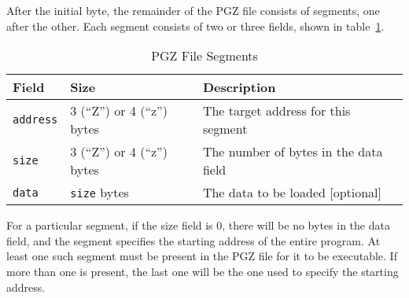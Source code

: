 After the initial byte, the remainder of the PGZ file consists of segments, one after the other. Each segment consists of two or three fields,
shown in table~\ref{tbl:pgz_file_segments}.

\begin{table}
	\begin{center}
		\begin{tabular}{|l|l|l|} \hline
			Field &	Size & Description \\ \hline\hline
			\verb+address+ & 3 (“Z”) or 4 (“z”) bytes & The target address for this segment \\ \hline
			\verb+size+ & 3 (“Z”) or 4 (“z”) bytes & The number of bytes in the data field \\ \hline
			\verb+data+ & \verb+size+ bytes & The data to be loaded [optional] \\ \hline
		\end{tabular}
	\end{center}
	\caption{PGZ File Segments}
	\label{tbl:pgz_file_segments}
\end{table}

For a particular segment, if the size field is 0, there will be no bytes in the data field,
and the segment specifies the starting address of the entire program.
At least one such segment must be present in the PGZ file for it to be executable.
If more than one is present, the last one will be the one used to specify the starting address.